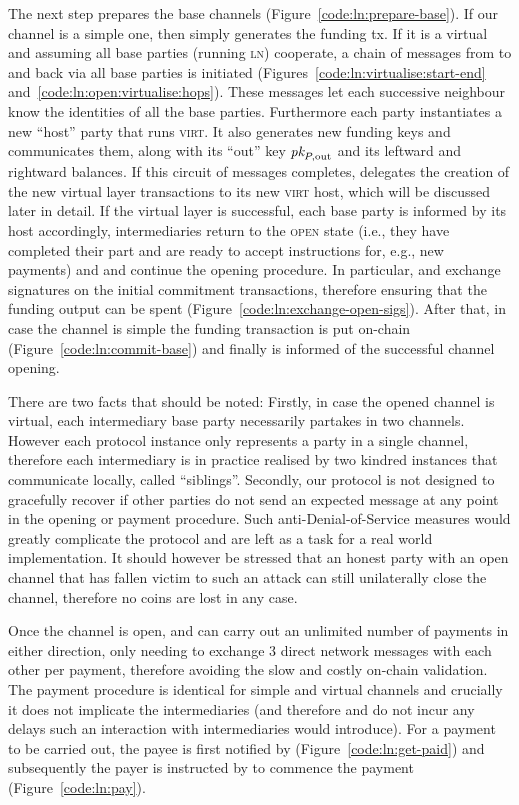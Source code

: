   The next step prepares the base channels (Figure~\ref{code:ln:prepare-base}).
  If our channel is a simple one, then \alice simply generates the funding tx.
  If it is a virtual and assuming all base parties (running \textsc{ln})
  cooperate, a chain of messages from \alice to \bob and back via all base
  parties is initiated (Figures~\ref{code:ln:virtualise:start-end}
  and~\ref{code:ln:open:virtualise:hops}). These messages let each successive
  neighbour know the identities of all the base parties. Furthermore each party
  instantiates a new ``host'' party that runs \textsc{virt}. It also generates
  new funding keys and communicates them, along with its ``out'' key $\textit{pk}_{P,
  \mathrm{out}}$ and its
  leftward and rightward balances. If this circuit of messages completes, \alice
  delegates the creation of the new virtual layer transactions to its new
  \textsc{virt} host, which will be discussed later in detail. If the virtual
  layer is successful, each base party is informed by its host accordingly,
  intermediaries return to the \textsc{open} state (i.e., they have completed
  their part and are ready to accept instructions for, e.g., new payments) and \alice and
  \bob continue
  the opening procedure. In particular, \alice and \bob exchange signatures on
  the initial commitment transactions, therefore ensuring that the funding
  output can be spent (Figure~\ref{code:ln:exchange-open-sigs}). After that, in
  case the channel is simple the funding transaction is put on-chain
  (Figure~\ref{code:ln:commit-base}) and finally \environment is informed of the
  successful channel opening.

  There are two facts that should be noted: Firstly, in case the opened channel
  is virtual, each intermediary base party necessarily partakes in two channels.
  However each protocol instance only represents a party in a single channel,
  therefore each intermediary is in practice realised by two kindred
  \pchan instances that communicate locally, called ``siblings''. Secondly, our
  protocol is not designed to gracefully recover if other parties do not send an
  expected message at any point in the opening or payment procedure. Such
  anti-Denial-of-Service measures would greatly complicate the protocol and are
  left as a task for a real world implementation. It should however be stressed
  that an honest party with an open channel that has fallen victim to such an
  attack can still unilaterally close the channel, therefore no coins are lost
  in any case.

  Once the channel is open, \alice and \bob can carry out an unlimited number of
  payments in either direction, only needing to exchange $3$ direct network
  messages with each other per payment, therefore avoiding the slow and costly
  on-chain validation. The payment procedure is identical for simple and virtual
  channels and crucially it does not implicate the intermediaries (and therefore
  \alice and \bob do not incur any delays such an interaction with
  intermediaries would introduce). For a payment to be carried out, the payee is
  first notified by \environment (Figure~\ref{code:ln:get-paid}) and
  subsequently the payer is instructed by \environment to commence the payment
  (Figure~\ref{code:ln:pay}).

